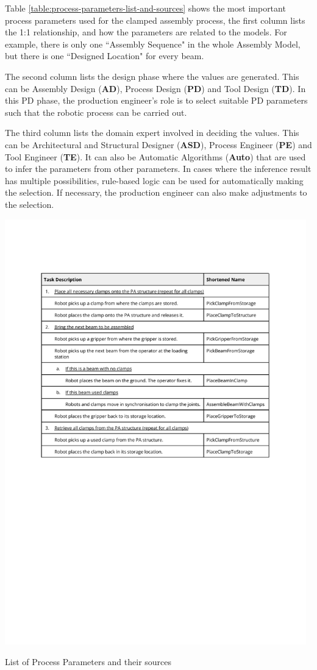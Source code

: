 Table \ref{table:process-parameters-list-and-sources} shows the most important process parameters used for the clamped assembly process, the first column lists the 1:1 relationship, and how the parameters are related to the models. For example, there is only one ``Assembly Sequence" in the whole Assembly Model, but there is one ``Designed Location" for every beam.

The second column lists the design phase where the values are generated. This can be Assembly Design (\textbf{AD}), Process Design (\textbf{PD}) and Tool Design (\textbf{TD}). In this PD phase, the production engineer’s role is to select suitable PD parameters such that the robotic process can be carried out.

The third column lists the domain expert involved in deciding the values. This can be Architectural and Structural Designer (\textbf{ASD}), Process Engineer (\textbf{PE}) and Tool Engineer (\textbf{TE}). It can also be Automatic Algorithms (\textbf{Auto}) that are used to infer the parameters from other parameters. In cases where the inference result has multiple possibilities, rule-based logic can be used for automatically making the selection. If necessary, the production engineer can also make adjustments to the selection.

\begin{table}[!hp]
    \includegraphics[page=4, trim=25.4mm 50mm 25.4mm 33mm, clip, width=0.98\textwidth]{tables/Tables in Chapter 6.pdf}
    \caption{List of Process Parameters and their sources}
    \label{table:process-parameters-list-and-sources}
\end{table}


